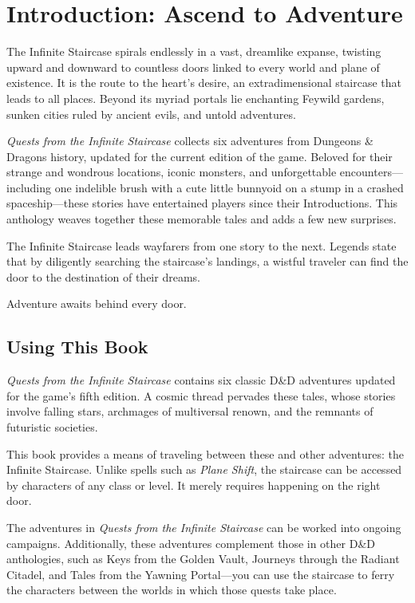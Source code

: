 \documentclass[10pt,a4paper,twoside,bg=print,twocolumn,openany,nodeprecatedcode]{dndbook}
\date{}
\begin{document}
\frontmatter
\tableofcontents
\mainmatter
{}
\chapter*{Introduction: Ascend to Adventure}
The Infinite Staircase spirals endlessly in a vast, dreamlike expanse, twisting upward and downward to countless doors linked to every world and plane of existence. It is the route to the heart's desire, an extradimensional staircase that leads to all places. Beyond its myriad portals lie enchanting Feywild gardens, sunken cities ruled by ancient evils, and untold adventures.

\textit{Quests from the Infinite Staircase} collects six adventures from Dungeons \& Dragons history, updated for the current edition of the game. Beloved for their strange and wondrous locations, iconic monsters, and unforgettable encounters—including one indelible brush with a cute little bunnyoid on a stump in a crashed spaceship—these stories have entertained players since their Introductions. This anthology weaves together these memorable tales and adds a few new surprises.

The Infinite Staircase leads wayfarers from one story to the next. Legends state that by diligently searching the staircase's landings, a wistful traveler can find the door to the destination of their dreams.

Adventure awaits behind every door.

\section{Using This Book}
\textit{Quests from the Infinite Staircase} contains six classic D\&D adventures updated for the game's fifth edition. A cosmic thread pervades these tales, whose stories involve falling stars, archmages of multiversal renown, and the remnants of futuristic societies.

This book provides a means of traveling between these and other adventures: the Infinite Staircase. Unlike spells such as \textit{Plane Shift}, the staircase can be accessed by characters of any class or level. It merely requires happening on the right door.

The adventures in \textit{Quests from the Infinite Staircase} can be worked into ongoing campaigns. Additionally, these adventures complement those in other D\&D anthologies, such as Keys from the Golden Vault, Journeys through the Radiant Citadel, and Tales from the Yawning Portal—you can use the staircase to ferry the characters between the worlds in which those quests take place.
\end{document}
